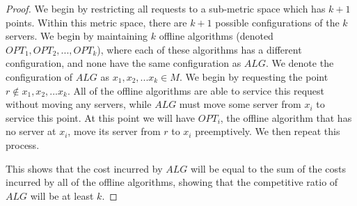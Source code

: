 \begin{proof}
    We begin by restricting all requests to a sub-metric space which has $k+1$ points. Within this metric space, there are $k+1$ possible configurations of the $k$ servers. We begin by maintaining $k$ offline algorithms (denoted $OPT_1, OPT_2, ..., OPT_k$), where each of these algorithms has a different configuration, and none have the same configuration as $ALG$. We denote the configuration of $ALG$ as $x_1, x_2, ...x_k \in M$. We begin by requesting the point $r \not \in x_1, x_2, ...x_k$. All of the offline algorithms are able to service this request without moving any servers, while $ALG$ must move some server from $x_i$ to service this point. At this point we will have $OPT_i$, the offline algorithm that has no server at $x_i$, move its server from $r$ to $x_i$ preemptively. We then repeat this process.

    This shows that the cost incurred by $ALG$ will be equal to the sum of the costs incurred by all of the offline algorithms, showing that the competitive ratio of $ALG$ will be at least $k$.
\end{proof}